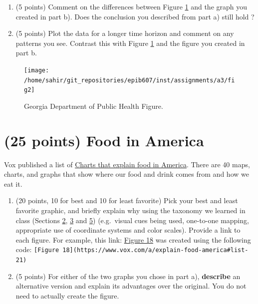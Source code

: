 \documentclass[letterpaper,12pt,twoside,]{pinp}
\providecommand{\tightlist}{%
  \setlength{\itemsep}{0pt}\setlength{\parskip}{0pt}}
\begin{document}
\begin{enumerate}
\def\labelenumi{\alph{enumi})}
\setcounter{enumi}{2}
\tightlist
\item
  (5 points) Comment on the differences between Figure \ref{fig:fig2}
  and the graph you created in part b). Does the conclusion you
  described from part a) still hold ?\\
\item
  (5 points) Plot the data for a longer time horizon and comment on any
  patterns you see. Contrast this with Figure \ref{fig:fig2} and the
  figure you created in part b.
\end{enumerate}

\begin{figure}

{\centering \texttt{[image: /home/sahir/git\_repositories/epib607/inst/assignments/a3/fig2]} 

}

\caption{Georgia Department of Public Health Figure.}\label{fig:fig2}
\end{figure}

\newpage

\newpage

\hypertarget{points-food-in-america}{%
\section{(25 points) Food in America}\label{points-food-in-america}}

Vox published a list of
\href{http://www.vox.com/a/explain-food-america}{Charts that explain
food in America}. There are 40 maps, charts, and graphs that show where
our food and drink comes from and how we eat it.

\begin{enumerate}
\def\labelenumi{\alph{enumi})}
\tightlist
\item
  (20 points, 10 for best and 10 for least favorite) Pick your best and
  least favorite graphic, and briefly explain why using the taxonomy we
  learned in class (Sections
  \href{https://sahirbhatnagar.com/EPIB607/aesthetic-mapping.html}{2},
  \href{https://sahirbhatnagar.com/EPIB607/coordinate-systems-axes.html}{3}
  and \href{https://sahirbhatnagar.com/EPIB607/color-basics.html}{5})
  (e.g.~visual cues being used, one-to-one mapping, appropriate use of
  coordinate systems and color scales). Provide a link to each figure.
  For example, this link:
  \href{https://www.vox.com/a/explain-food-america\#list-21}{Figure 18}
  was created using the following code:
  \texttt{{[}Figure\ 18{]}(https://www.vox.com/a/explain-food-america\#list-21)}
\item
  (5 points) For either of the two graphs you chose in part a),
  \textbf{describe} an alternative version and explain its advantages
  over the original. You do not need to actually create the figure.
\end{enumerate}
\end{document}
